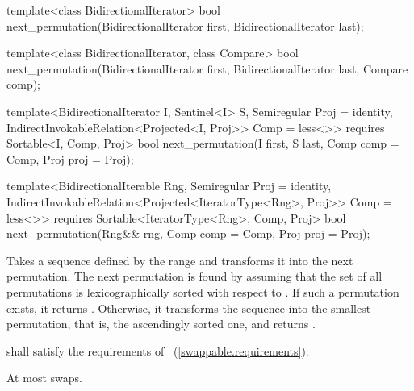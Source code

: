 %
\begin{removedblock}
\begin{itemdecl}
template<class BidirectionalIterator>
  bool next_permutation(BidirectionalIterator first,
                        BidirectionalIterator last);

template<class BidirectionalIterator, class Compare>
  bool next_permutation(BidirectionalIterator first,
                        BidirectionalIterator last, Compare comp);
\end{itemdecl}
\end{removedblock}
\begin{addedblock}
\begin{itemdecl}
template<BidirectionalIterator I, Sentinel<I> S, Semiregular Proj = identity,
    IndirectInvokableRelation<Projected<I, Proj>> Comp = less<>>
  requires Sortable<I, Comp, Proj>
  bool next_permutation(I first, S last, Comp comp = Comp{}, Proj proj = Proj{});

template<BidirectionalIterable Rng, Semiregular Proj = identity,
    IndirectInvokableRelation<Projected<IteratorType<Rng>, Proj>> Comp = less<>>
  requires Sortable<IteratorType<Rng>, Comp, Proj>
  bool
    next_permutation(Rng&& rng, Comp comp = Comp{}, Proj proj = Proj{});
\end{itemdecl}
\end{addedblock}

\begin{itemdescr}
\pnum
\effects
Takes a sequence defined by the range
and transforms it into the next permutation.
The next permutation is found by assuming that the set of all permutations is
lexicographically sorted with respect to
 .
If such a permutation exists, it returns
.
Otherwise, it transforms the sequence into the smallest permutation,
that is, the ascendingly sorted one, and returns
.

\begin{removedblock}
\pnum
\requires
{} shall satisfy the requirements of
~(\ref{swappable.requirements}).
\end{removedblock}

\pnum
\complexity
At most
swaps.
\end{itemdescr}

